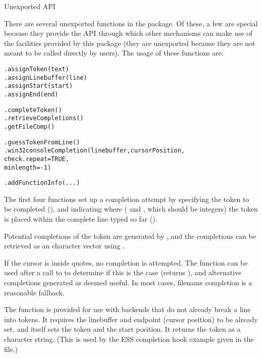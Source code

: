 %
\begin{Section}{Unexported API}

There are several unexported functions in the package.  Of these, 
a few are special because they provide the API through which other
mechanisms can make use of the facilities provided by this package
(they are unexported because they are not meant to be called directly
by users).  The usage of these functions are:

\begin{alltt}    .assignToken(text)
    .assignLinebuffer(line)
    .assignStart(start)
    .assignEnd(end)

    .completeToken()
    .retrieveCompletions()
    .getFileComp()

    .guessTokenFromLine()
    .win32consoleCompletion(linebuffer, cursorPosition,
                            check.repeat = TRUE, 
                            minlength = -1)

    .addFunctionInfo(...)
\end{alltt}


The first four functions set up a completion attempt by specifying the
token to be completed (), and indicating where
( and , which should be integers) the token is
placed within the complete line typed so far ().

Potential completions of the token are generated by
, and the completions can be retrieved as an \R{}
character vector using .

If the cursor is inside quotes, no completion is attempted.  The
function  can be used after a call to
 to determine if this is the case (returns
), and alternative completions generated as deemed useful.
In most cases, filename completion is a reasonable fallback.

The  function is provided for use with
backends that do not already break a line into tokens.  It requires
the linebuffer and endpoint (cursor position) to be already set, and
itself sets the token and the start position.  It returns the token as
a character string.  (This is used by the ESS completion hook example
given in the  file.)


\end{Section}
